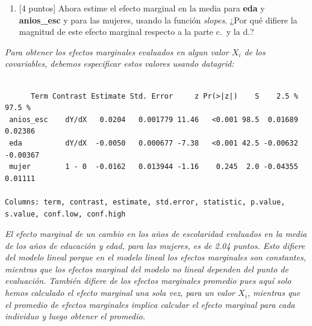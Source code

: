 \documentclass[
  letterpaper,
  DIV=11,
  numbers=noendperiod]{scrartcl}
\newenvironment{Shaded}{\begin{snugshade}}{\end{snugshade}}
\newcommand{\AttributeTok}[1]{\textcolor[rgb]{0.40,0.45,0.13}{#1}}
\newcommand{\DecValTok}[1]{\textcolor[rgb]{0.68,0.00,0.00}{#1}}
\newcommand{\FunctionTok}[1]{\textcolor[rgb]{0.28,0.35,0.67}{#1}}
\newcommand{\NormalTok}[1]{\textcolor[rgb]{0.00,0.23,0.31}{#1}}
\newcommand{\SpecialCharTok}[1]{\textcolor[rgb]{0.37,0.37,0.37}{#1}}
\providecommand{\tightlist}{%
  \setlength{\itemsep}{0pt}\setlength{\parskip}{0pt}}\usepackage{longtable,booktabs,array}
\begin{document}
\begin{enumerate}
\def\labelenumi{\alph{enumi}.}
\tightlist
\item
  {[}4 puntos{]} Ahora estime el efecto marginal en la media para
  \textbf{eda} y \textbf{anios\_esc} y para las mujeres, usando la
  función \emph{slopes}. ¿Por qué difiere la magnitud de este efecto
  marginal respecto a la parte c.~y la d.?
\end{enumerate}

\emph{Para obtener los efectos marginales evaluados en algun valor
\(X_i\) de los covariables, debemos especificar estos valores usando
datagrid:}

\begin{Shaded}
\end{Shaded}

\begin{verbatim}

      Term Contrast Estimate Std. Error     z Pr(>|z|)    S    2.5 %   97.5 %
 anios_esc    dY/dX   0.0204   0.001779 11.46   <0.001 98.5  0.01689  0.02386
 eda          dY/dX  -0.0050   0.000677 -7.38   <0.001 42.5 -0.00632 -0.00367
 mujer        1 - 0  -0.0162   0.013944 -1.16    0.245  2.0 -0.04355  0.01111

Columns: term, contrast, estimate, std.error, statistic, p.value, s.value, conf.low, conf.high 
\end{verbatim}

\emph{El efecto marginal de un cambio en los años de escolaridad
evaluados en la media de los años de educación y edad, para las mujeres,
es de 2.04 puntos. Esto difiere del modelo lineal porque en el modelo
lineal los efectos marginales son constantes, mientras que los efectos
marginal del modelo no lineal dependen del punto de evaluación. También
difiere de los efectos marginales promedio pues aquí solo hemos
calculado el efecto marginal una sola vez, para un valor \(X_i\),
mientras que el promedio de efectos marginales implica calcular el
efecto marginal para cada individuo y luego obtener el promedio.}
\end{document}
